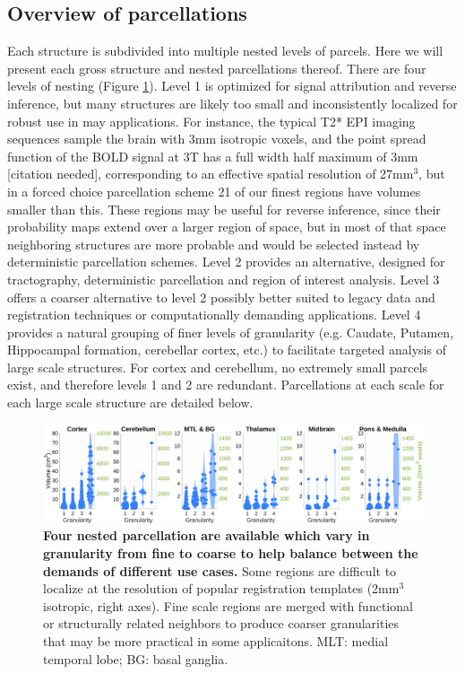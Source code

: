 \documentclass[10pt,letterpaper]{article}
\begin{document}
\subsection{Overview of parcellations}
Each structure is subdivided into multiple nested levels of parcels. Here we will present each gross structure and nested parcellations thereof. There are four levels of nesting (Figure \ref{granularities-overview-figure}). Level 1 is optimized for signal attribution and reverse inference, but many structures are likely too small and inconsistently localized for robust use in may applications. For instance, the typical T2* EPI imaging sequences sample the brain with 3mm isotropic voxels, and the point spread function of the BOLD signal at 3T has a full width half maximum of 3mm [citation needed], corresponding to an effective spatial resolution of 27mm$^3$, but in a forced choice parcellation scheme 21 of our finest regions have volumes smaller than this. These regions may be useful for reverse inference, since their probability maps extend over a larger region of space, but in most of that space neighboring structures are more probable and would be selected instead by deterministic parcellation schemes. Level 2 provides an alternative, designed for tractography, deterministic parcellation and region of interest analysis. Level 3 offers a coarser alternative to level 2 possibly better suited to legacy data and registration techniques or computationally demanding applications. Level 4 provides a natural grouping of finer levels of granularity (e.g. Caudate, Putamen, Hippocampal formation, cerebellar cortex, etc.) to facilitate targeted analysis of large scale structures. For cortex and cerebellum, no extremely small parcels exist, and therefore levels 1 and 2 are redundant. Parcellations at each scale for each large scale structure are detailed below.

\begin{figure}[t]
\centering
\includegraphics[width=\linewidth]{images/parcel_sizes.png}
\caption{
{\bf
Four nested parcellation are available which vary in granularity from fine to coarse to help balance between the demands of different use cases.} Some regions are difficult to localize at the resolution of popular registration templates (2mm$^3$ isotropic, right axes). Fine scale regions are merged with functional or structurally related neighbors to produce coarser granularities that may be more practical in some applicaitons. MLT: medial temporal lobe; BG: basal ganglia.
}
\label{granularities-overview-figure}
\end{figure}
\end{document}
